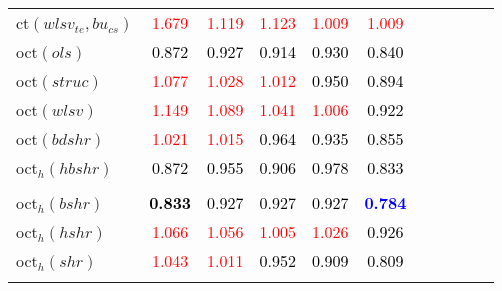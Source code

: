 \begin{tabular}[t]{l|>{}cccc>{}c|ccccc}
ct$(wlsv_{te}, bu_{cs})$ & \textcolor{red}{1.679} & \textcolor{red}{1.119} & \textcolor{red}{1.123} & \textcolor{red}{1.009} & \textcolor{red}{1.009} &  &  &  &  & \\
oct$(ols)$ & \textcolor{black}{0.872} & \textcolor{black}{0.927} & \textcolor{black}{0.914} & \textcolor{black}{0.930} & \textcolor{black}{0.840} &  &  &  &  & \\
oct$(struc)$ & \textcolor{red}{1.077} & \textcolor{red}{1.028} & \textcolor{red}{1.012} & \textcolor{black}{0.950} & \textcolor{black}{0.894} &  &  &  &  & \\
oct$(wlsv)$ & \textcolor{red}{1.149} & \textcolor{red}{1.089} & \textcolor{red}{1.041} & \textcolor{red}{1.006} & \textcolor{black}{0.922} &  &  &  &  & \\
oct$(bdshr)$ & \textcolor{red}{1.021} & \textcolor{red}{1.015} & \textcolor{black}{0.964} & \textcolor{black}{0.935} & \textcolor{black}{0.855} &  &  &  &  & \\
oct$_h(hbshr)$ & \textcolor{black}{0.872} & \textcolor{black}{0.955} & \textcolor{black}{0.906} & \textcolor{black}{0.978} & \textcolor{black}{0.833} &  &  &  &  & \\[-1.5ex]
\hline\\[-1.5ex]
oct$_h(bshr)$ & \textcolor{black}{\textbf{0.833}} & \textcolor{black}{0.927} & \textcolor{black}{0.927} & \textcolor{black}{0.927} & \textcolor{blue}{\textbf{0.784}} &  &  &  &  & \\
oct$_h(hshr)$ & \textcolor{red}{1.066} & \textcolor{red}{1.056} & \textcolor{red}{1.005} & \textcolor{red}{1.026} & \textcolor{black}{0.926} &  &  &  &  & \\
oct$_h(shr)$ & \textcolor{red}{1.043} & \textcolor{red}{1.011} & \textcolor{black}{0.952} & \textcolor{black}{0.909} & \textcolor{black}{0.809} &  &  &  &  & \\
\bottomrule
{}\\
\end{tabular}
